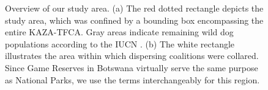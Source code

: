 \documentclass[abstract=on,10pt,a4paper,bibliography=totocnumbered]{article}
\begin{document}
\begin{figure}[h]
  \begin{center}
    \caption{Overview of our study area. (a) The red dotted rectangle depicts
    the study area, which was confined by a bounding box encompassing the entire
    KAZA-TFCA. Gray areas indicate remaining wild dog populations according to
    the IUCN \citep{Woodroffe.2012}. (b) The white rectangle illustrates the
    area within which dispersing coalitions were collared. Since Game Reserves
    in Botswana virtually serve the same purpose as National Parks, we use the
    terms interchangeably for this region.}
    \label{StudyArea}
  \end{center}
\end{figure}
\end{document}
